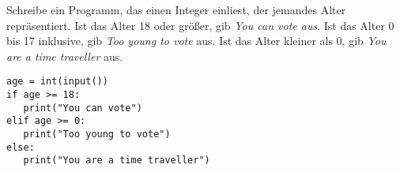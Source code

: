 \question[4]
Schreibe ein Programm, das einen Integer einliest, der jemandes Alter repräsentiert. Ist das Alter 18 oder größer,
gib \textit{You can vote aus}. Ist das Alter 0 bis 17 inklusive, gib \textit{Too young to vote} aus.
Ist das Alter kleiner als 0, gib \textit{You are a time traveller} aus.
\begin{solutionbox}{6cm}
\begin{lstlisting}
age = int(input())
if age >= 18:
   print("You can vote")
elif age >= 0:
   print("Too young to vote")
else:
   print("You are a time traveller")
\end{lstlisting}
\end{solutionbox}
